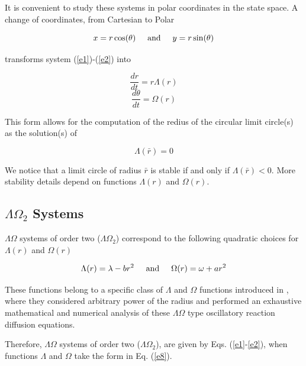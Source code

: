It is convenient to study these systems in polar coordinates in the state space. A change of coordinates, from Cartesian to Polar

\begin{equation}
    x = r\cos(\theta) \hspace{0.5cm} \text{and} \hspace{0.5cm} y = r\sin(\theta)
    \label{e4}
\end{equation}

transforms system (\ref{e1})-(\ref{e2}) into

\begin{equation}
    \frac{dr}{dt} = r\Lambda(r)
    \label{e5}
\end{equation}
\begin{equation}
    \frac{d\theta}{dt} = \Omega(r)
    \label{e6}
\end{equation}

This form allows for the computation of the redius of the circular limit circle(s) as the solution(s) of

\begin{equation}
    \Lambda(\bar{r}) = 0
    \label{e7}
\end{equation}

We notice that a limit circle of radius $\bar{r}$ is stable if and only if $\Lambda(\bar{r})<0$. More stability details depend on functions $\Lambda(r)$ and $\Omega(r)$.

\subsection{$\Lambda \Omega_{2}$ Systems}
$\Lambda \Omega$ systems of order two ($\Lambda \Omega_{2}$) correspond to the following quadratic choices for $\Lambda(r)$ and $\Omega(r)$

\begin{equation}
    \Lambda(r) = \lambda - br^{2} \hspace{0.5cm} \text{and} \hspace{0.5cm} \Omega(r) = \omega + ar^{2}
    \label{e8}
\end{equation}

These functions belong to a specific class of $\Lambda$ and $\Omega$ functions introduced in \cite{Blowey2005,Garvie2005}, where they considered arbitrary power of the radius and performed an exhaustive mathematical and numerical analysis of these $\Lambda \Omega$ type oscillatory reaction diffusion equations.

Therefore, $\Lambda \Omega$ systems of order two ($\Lambda \Omega_{2}$), are given by Eqs. (\ref{e1}-\ref{e2}), when functions $\Lambda$ and $\Omega$ take the form in Eq. (\ref{e8}).

